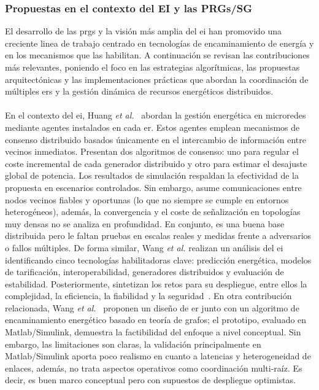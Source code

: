 \subsubsection{Propuestas en el contexto del EI y las PRGs/SG}
\label{subsubsec:propuestas_sg}

El desarrollo de las \glspl{prg} y la visión más amplia del \gls{ei} han promovido una creciente linea de trabajo centrado en tecnologías de encaminamiento de energía y en los mecanismos que las habilitan. A continuación se revisan las contribuciones más relevantes, poniendo el foco en las estrategias algorítmicas, las propuestas arquitectónicas y las implementaciones prácticas que abordan la coordinación de múltiples \glspl{er} y la gestión dinámica de recursos energéticos distribuidos.\\
\\
En el contexto del \gls{ei}, Huang \textit{et al.}~\cite{Huang16} abordan la gestión energética en microredes mediante agentes instalados en cada \gls{er}. Estos agentes emplean mecanismos de consenso distribuido basados únicamente en el intercambio de información entre vecinos inmediatos. Presentan dos algoritmos de consenso: uno para regular el coste incremental de cada generador distribuido y otro para estimar el desajuste global de potencia. Los resultados de simulación respaldan la efectividad de la propuesta en escenarios controlados. Sin embargo, asume comunicaciones entre nodos vecinos fiables y oportunas (lo que no siempre se cumple en entornos heterogéneos), además, la convergencia y el coste de señalización en topologías muy densas no se analiza en profundidad. En conjunto, es una buena base distribuida pero le faltan pruebas en escalas reales y medidas frente a adversarios o fallos múltiples. De forma similar, Wang \textit{et al.} realizan un análisis del \gls{ei} identificando cinco tecnologías habilitadoras clave: predicción energética, modelos de tarificación, interoperabilidad, generadores distribuidos y evaluación de estabilidad. Posteriormente, sintetizan los retos para su despliegue, entre ellos la complejidad, la eficiencia, la fiabilidad y la seguridad~\cite{wang17-2}. En otra contribución relacionada, Wang \textit{et al.}~\cite{Wang17-1} proponen un diseño de \gls{er} junto con un algoritmo de encaminamiento energético basado en teoría de grafos; el prototipo, evaluado en Matlab/Simulink, demuestra la factibilidad del enfoque a nivel conceptual. Sin embargo, las limitaciones son claras, la validación principalmente en Matlab/Simulink aporta poco realismo en cuanto a latencias y heterogeneidad de enlaces, además, no trata aspectos operativos como coordinación multi-raíz. Es decir, es buen marco conceptual pero con supuestos de despliegue optimistas.\\
